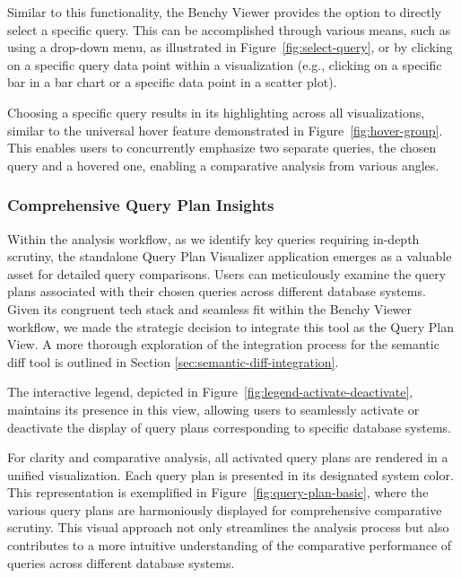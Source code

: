 Similar to this functionality, the Benchy Viewer provides the option to directly select a specific query. This can be accomplished through various means, such as using a drop-down menu, as illustrated in Figure~\ref{fig:select-query}, or by clicking on a specific query data point within a visualization (e.g., clicking on a specific bar in a bar chart or a specific data point in a scatter plot).

Choosing a specific query results in its highlighting across all visualizations, similar to the universal hover feature demonstrated in Figure~\ref{fig:hover-group}. This enables users to concurrently emphasize two separate queries, the chosen query and a hovered one, enabling a comparative analysis from various angles.

\subsubsection{Comprehensive Query Plan Insights}

Within the analysis workflow, as we identify key queries requiring in-depth scrutiny, the standalone Query Plan Visualizer application \parencite*{semantic-diff} emerges as a valuable asset for detailed query comparisons. Users can meticulously examine the query plans associated with their chosen queries across different database systems. Given its congruent tech stack and seamless fit within the Benchy Viewer workflow, we made the strategic decision to integrate this tool as the Query Plan View. A more thorough exploration of the integration process for the semantic diff tool is outlined in Section \ref{sec:semantic-diff-integration}.

The interactive legend, depicted in Figure~\ref{fig:legend-activate-deactivate}, maintains its presence in this view, allowing users to seamlessly activate or deactivate the display of query plans corresponding to specific database systems.

For clarity and comparative analysis, all activated query plans are rendered in a unified visualization. Each query plan is presented in its designated system color. This representation is exemplified in Figure~\ref{fig:query-plan-basic}, where the various query plans are harmoniously displayed for comprehensive comparative scrutiny. This visual approach not only streamlines the analysis process but also contributes to a more intuitive understanding of the comparative performance of queries across different database systems.

